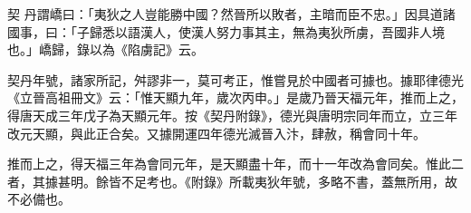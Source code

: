 \begin{pinyinscope}
 契
 丹謂嶠曰：「夷狄之人豈能勝中國？然晉所以敗者，主暗而臣不忠。」因具道諸國事，曰：「子歸悉以語漢人，使漢人努力事其主，無為夷狄所虜，吾國非人境也。」嶠歸，錄以為《陷虜記》云。



 契丹年號，諸家所記，舛謬非一，莫可考正，惟嘗見於中國者可據也。據耶律德光《立晉高祖冊文》云：「惟天顯九年，歲次丙申。」是歲乃晉天福元年，推而上之，得唐天成三年戊子為天顯元年。按《契丹附錄》，德光與唐明宗同年而立，立三年改元天顯，與此正合矣。又據開運四年德光滅晉入汴，肆赦，稱會同十年。



 推而上之，得天福三年為會同元年，是天顯盡十年，而十一年改為會同矣。惟此二者，其據甚明。餘皆不足考也。《附錄》所載夷狄年號，多略不書，蓋無所用，故不必備也。



\end{pinyinscope}